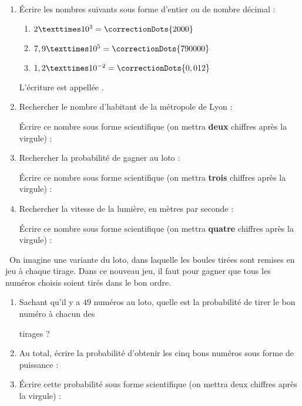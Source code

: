 \documentclass[
	classe=$2^{de}$,
	headerTitle=Activité\space Chapitre\space 2
]{exercice}
\begin{document}
\vspace{1em}
\begin{exercice}\

	\begin{enumerate}
		\item Écrire les nombres suivants sous forme d'entier ou de nombre décimal :
		      \begin{multicols}{3}
			      \begin{enumerate}
				      \item $2 × 10^{3} = \correctionDots{2000}$
				      \item $7,9 × 10^{5} = \correctionDots{790000}$
				      \item $1,2 × 10^{-2} = \correctionDots{0,012}$
			      \end{enumerate}
		      \end{multicols}
		      L'écriture  est appellée . \vspace{1em}
		\item Rechercher le nombre d'habitant de la métropole de Lyon : 

		      Écrire ce nombre sous forme scientifique (on mettra \textbf{deux} chiffres après la virgule) : 
		\item Rechercher la probabilité de gagner au loto : 

		      Écrire ce nombre sous forme scientifique (on mettra \textbf{trois} chiffres après la virgule) : 
		\item Rechercher la vitesse de la lumière, en mètres par seconde : 

		      Écrire ce nombre sous forme scientifique (on mettra \textbf{quatre} chiffres après la virgule) : 
	\end{enumerate}
\end{exercice}

\vspace{1em}
\begin{exercice}\
	On imagine une variante du loto, dans laquelle les boules tirées sont remises en jeu à chaque tirage. Dans ce nouveau jeu, il faut pour gagner que tous les numéros choisis soient tirés dans le bon ordre.

	\begin{enumerate}
		\item Sachant qu'il y a $49$ numéros au loto, quelle est la probabilité de tirer le bon numéro à chacun des \vspace{0em}

		      tirages ?
		\item Au total, écrire la probabilité d'obtenir les cinq bons numéros sous forme de puissance : 
		\item Écrire cette probabilité sous forme scientifique (on mettra deux chiffres après la virgule) :

	\end{enumerate}
\end{exercice}
\end{document}
